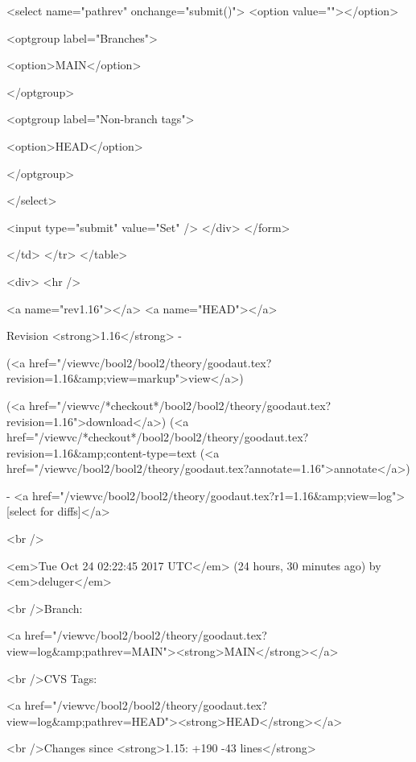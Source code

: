 <select name="pathrev" onchange="submit()">
<option value=""></option>

<optgroup label="Branches">


<option>MAIN</option>


</optgroup>

<optgroup label="Non-branch tags">


<option>HEAD</option>


</optgroup>

</select>

<input type="submit" value="Set" />
</div>
</form>

</td>
</tr>
</table>
 







<div>
<hr />

<a name="rev1.16"></a>
<a name="HEAD"></a>


Revision <strong>1.16</strong> -


(<a href="/viewvc/bool2/bool2/theory/goodaut.tex?revision=1.16&amp;view=markup">view</a>)


(<a href="/viewvc/*checkout*/bool2/bool2/theory/goodaut.tex?revision=1.16">download</a>)
(<a href="/viewvc/*checkout*/bool2/bool2/theory/goodaut.tex?revision=1.16&amp;content-type=text%
(<a href="/viewvc/bool2/bool2/theory/goodaut.tex?annotate=1.16">annotate</a>)



- <a href="/viewvc/bool2/bool2/theory/goodaut.tex?r1=1.16&amp;view=log">[select for diffs]</a>




<br />

<em>Tue Oct 24 02:22:45 2017 UTC</em>
(24 hours, 30 minutes ago)
by <em>deluger</em>


<br />Branch:

<a href="/viewvc/bool2/bool2/theory/goodaut.tex?view=log&amp;pathrev=MAIN"><strong>MAIN</strong></a>



<br />CVS Tags:

<a href="/viewvc/bool2/bool2/theory/goodaut.tex?view=log&amp;pathrev=HEAD"><strong>HEAD</strong></a>






<br />Changes since <strong>1.15: +190 -43 lines</strong>








